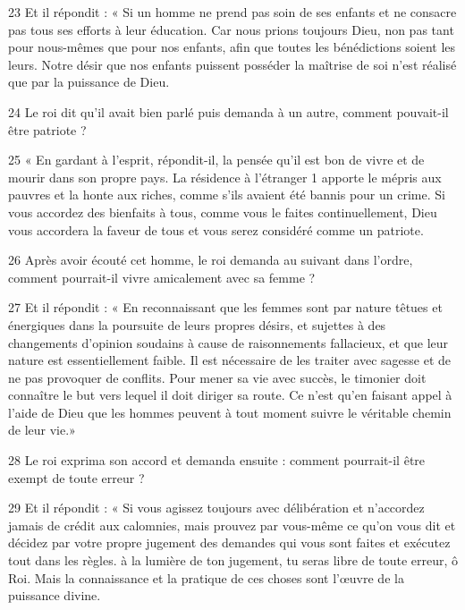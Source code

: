 \par 23 Et il répondit : « Si un homme ne prend pas soin de ses enfants et ne consacre pas tous ses efforts à leur éducation. Car nous prions toujours Dieu, non pas tant pour nous-mêmes que pour nos enfants, afin que toutes les bénédictions soient les leurs. Notre désir que nos enfants puissent posséder la maîtrise de soi n'est réalisé que par la puissance de Dieu.

\par 24 Le roi dit qu'il avait bien parlé puis demanda à un autre, comment pouvait-il être patriote ?

\par 25 « En gardant à l'esprit, répondit-il, la pensée qu'il est bon de vivre et de mourir dans son propre pays. La résidence à l'étranger 1 apporte le mépris aux pauvres et la honte aux riches, comme s'ils avaient été bannis pour un crime. Si vous accordez des bienfaits à tous, comme vous le faites continuellement, Dieu vous accordera la faveur de tous et vous serez considéré comme un patriote.

\par 26 Après avoir écouté cet homme, le roi demanda au suivant dans l'ordre, comment pourrait-il vivre amicalement avec sa femme ?

\par 27 Et il répondit : « En reconnaissant que les femmes sont par nature têtues et énergiques dans la poursuite de leurs propres désirs, et sujettes à des changements d’opinion soudains à cause de raisonnements fallacieux, et que leur nature est essentiellement faible. Il est nécessaire de les traiter avec sagesse et de ne pas provoquer de conflits. Pour mener sa vie avec succès, le timonier doit connaître le but vers lequel il doit diriger sa route. Ce n’est qu’en faisant appel à l’aide de Dieu que les hommes peuvent à tout moment suivre le véritable chemin de leur vie.»

\par 28 Le roi exprima son accord et demanda ensuite : comment pourrait-il être exempt de toute erreur ?

\par 29 Et il répondit : « Si vous agissez toujours avec délibération et n'accordez jamais de crédit aux calomnies, mais prouvez par vous-même ce qu'on vous dit et décidez par votre propre jugement des demandes qui vous sont faites et exécutez tout dans les règles. à la lumière de ton jugement, tu seras libre de toute erreur, ô Roi. Mais la connaissance et la pratique de ces choses sont l'œuvre de la puissance divine.

